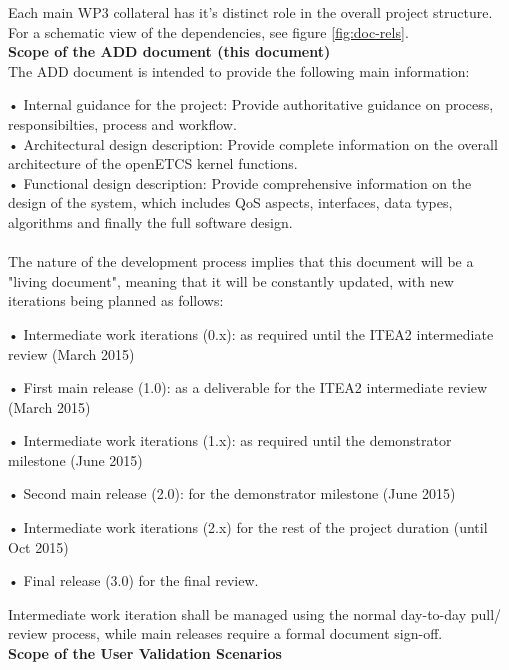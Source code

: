 Each main WP3 collateral has it's distinct role in the overall project structure. For a schematic view of the dependencies, see figure \ref{fig:doc-rels}. \\


\textbf{Scope of the ADD document (this document)}\\

 



The ADD document is intended to provide the following main information:

• Internal guidance for the project: Provide authoritative guidance on process, responsibilties, process and workflow.\\
 
• Architectural design description: Provide complete information on the overall architecture of the openETCS kernel functions.\\

• Functional design description: Provide comprehensive information on the design of the system, which includes QoS aspects, interfaces, data types, algorithms and finally the full software design.\\
\\

The nature of the development process implies that this document will be a "living document", meaning that it will be constantly updated, with new iterations being planned as follows:

•  Intermediate work iterations (0.x): as required until the ITEA2 intermediate review (March 2015)

• First main release (1.0): as a deliverable for the ITEA2 intermediate review (March 2015)

• Intermediate work iterations (1.x): as required until the demonstrator milestone (June 2015)

•  Second main release (2.0): for the demonstrator milestone (June 2015)

•  Intermediate work iterations (2.x) for the rest of the project duration (until Oct 2015)

•  Final release (3.0) for the final review.

Intermediate work iteration shall be managed using the normal day-to-day pull/ review process, while main releases require a formal document sign-off.\\

\textbf{Scope of the User Validation Scenarios}\\

